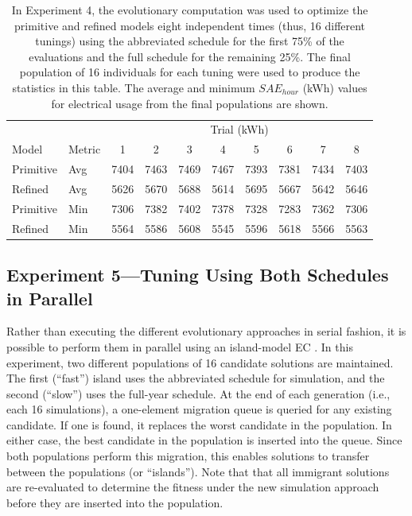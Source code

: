 \documentclass[preprint, review, 12pt]{elsarticle}
\begin{document}
\begin{table}[htbp]
\centering
\caption{In Experiment 4, the evolutionary computation was used to optimize the primitive and refined models eight independent times (thus, 16 different tunings) using the abbreviated schedule for the first 75\% of the evaluations and the full schedule for the remaining 25\%. The final population of 16 individuals for each tuning were used to produce the statistics in this table. The average and minimum $SAE_{hour}$ (kWh) values for electrical usage from the final populations are shown.}
\label{tab:hourly-serial}
\begin{tabular}{llcccccccc}
\toprule
 &  & \multicolumn{8}{c}{Trial (kWh)}\\
Model & Metric & 1 & 2 & 3 & 4 & 5 & 6 & 7 & 8\\
\midrule
Primitive & Avg & 7404 & 7463 & 7469 & 7467 & 7393 & 7381 & 7434 & 7403\\\rowcolor{DarkRow}
Refined   & Avg & 5626 & 5670 & 5688 & 5614 & 5695 & 5667 & 5642 & 5646\\
Primitive & Min & 7306 & 7382 & 7402 & 7378 & 7328 & 7283 & 7362 & 7306\\\rowcolor{DarkRow}
Refined   & Min & 5564 & 5586 & 5608 & 5545 & 5596 & 5618 & 5566 & 5563\\
\bottomrule
\end{tabular}
\end{table}

\subsection{Experiment 5---Tuning Using Both Schedules in Parallel}
\label{sub:experiment5}
Rather than executing the different evolutionary approaches in serial fashion, it is possible to perform them in parallel using an island-model EC \cite{cit:eiben2007}. In this experiment, two different populations of 16 candidate solutions are maintained. The first (``fast'') island uses the abbreviated schedule for simulation, and the second (``slow'') uses the full-year schedule. At the end of each generation (i.e., each 16 simulations), a one-element migration queue is queried for any existing candidate. If one is found, it replaces the worst candidate in the population. In either case, the best candidate in the population is inserted into the queue. Since both populations perform this migration, this enables solutions to transfer between the populations (or ``islands''). Note that that all immigrant solutions are re-evaluated to determine the fitness under the new simulation approach before they are inserted into the population.
\end{document}
